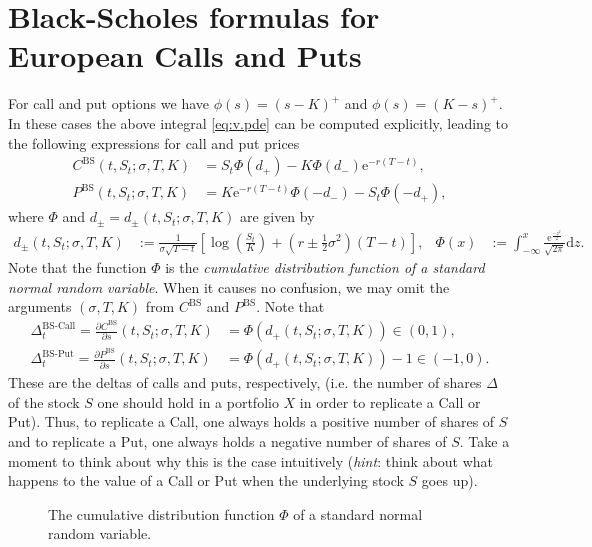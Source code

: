 \documentclass[12pt]{book}
\numberwithin{equation}{chapter}
\theoremstyle{plain}
\numberwithin{theorem}{section}
\theoremstyle{definition}
\numberwithin{exercise}{chapter}
\newcommand{\<}{\langle}
\renewcommand{\>}{\rangle}
\renewcommand{\(}{\left(}
\renewcommand{\)}{\right)}
\renewcommand{\[}{\left[}
\renewcommand{\]}{\right]}
\newcommand\sig{\sigma}
\newcommand\Del{\Delta}
\renewcommand\d{\partial}
\newcommand\dd{\mathrm{d}}
\newcommand\ee{\mathrm{e}}
\newcommand\BS{\textrm{BS}}
\theoremstyle{definition}
\numberwithin{question}{section}
\begin{document}
\section{Black-Scholes formulas for European Calls and Puts}
For call and put options we have $\phi(s) = (s-K)^+$ and $\phi(s) = (K-s)^+$.  In these cases the above integral \eqref{eq:v.pde} can be computed explicitly, leading to the following expressions for call and put prices
\begin{align}
C^\BS(t,S_t;\sig,T,K) 
	&= S_t \Phi(d_+) - K \Phi(d_-) \ee^{-r(T-t)}, \label{eq:BS-Call} \\
P^\BS(t,S_t;\sig,T,K) 
	&= K \ee^{-r(T-t)} \Phi(-d_-) - S_t \Phi(-d_+) , \label{eq:BS-Put}
\end{align}
where $\Phi$ and $d_\pm = d_\pm(t,S_t;\sig,T,K)$ are given by
\begin{align}
d_{\pm} (t,S_t;\sig,T,K)
	&:= \frac{1}{\sigma \sqrt{T-t}} \[ \log \( \frac{S_t}{K} \) + \( r \pm \frac{1}{2} \sigma^2 \)(T-t) \], &
\Phi(x) 
	&:= \int_{-\infty}^x \frac{\ee^{\frac{-z^2}{2}}}{\sqrt{2\pi}} \dd z . \label{eq:d-Phi}
\end{align}
Note that the function $\Phi$ is the \textit{cumulative distribution function of a standard normal random variable}.
When it causes no confusion, we may omit the arguments $(\sig,T,K)$ from $C^\BS$ and $P^\BS$.
Note that
\begin{align}
\Del_t^\text{BS-Call} = \frac{\d C^\BS}{\d s} (t,S_t;\sig,T,K) 
	&= \Phi(d_+(t,S_t;\sig,T,K)) \in (0,1), \label{eq:BS-Delta-Call} \\
\Del_t^\text{BS-Put} = \frac{\d P^\BS}{\d s} (t,S_t;\sig,T,K) 
	&= \Phi(d_+(t,S_t;\sig,T,K)) - 1 \in (-1,0) . \label{eq:BS-Delta-Put}
\end{align}
These are the deltas of calls and puts, respectively, (i.e. the number of shares $\Delta$ of the stock $S$ one should hold in a portfolio $X$ in order to replicate a Call or Put).  Thus, to replicate a Call, one always holds a positive number of shares of $S$ and to replicate a Put, one always holds a negative number of shares of $S$.  Take a moment to think about why this is the case intuitively (\textit{hint}: think about what happens to the value of a Call or Put when the underlying stock $S$ goes up).

\begin{figure}[hb!]
    \centering
    \caption{The cumulative distribution function $\Phi$ of a standard normal random variable. \label{fig:plot2_6}}
\end{figure}
\end{document}
